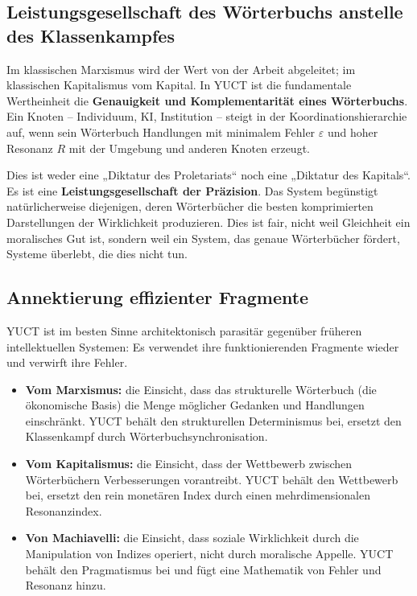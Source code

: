 \documentclass[12pt,a4paper]{article}
\begin{document}
\subsection{Leistungsgesellschaft des Wörterbuchs anstelle des Klassenkampfes}

Im klassischen Marxismus wird der Wert von der Arbeit abgeleitet; im klassischen Kapitalismus vom Kapital. In YUCT ist die fundamentale Wertheinheit die \textbf{Genauigkeit und Komplementarität eines Wörterbuchs}. Ein Knoten – Individuum, KI, Institution – steigt in der Koordinationshierarchie auf, wenn sein Wörterbuch Handlungen mit minimalem Fehler \(\varepsilon\) und hoher Resonanz \(R\) mit der Umgebung und anderen Knoten erzeugt.

Dies ist weder eine „Diktatur des Proletariats“ noch eine „Diktatur des Kapitals“. Es ist eine \textbf{Leistungsgesellschaft der Präzision}. Das System begünstigt natürlicherweise diejenigen, deren Wörterbücher die besten komprimierten Darstellungen der Wirklichkeit produzieren. Dies ist fair, nicht weil Gleichheit ein moralisches Gut ist, sondern weil ein System, das genaue Wörterbücher fördert, Systeme überlebt, die dies nicht tun.

\subsection{Annektierung effizienter Fragmente}

YUCT ist im besten Sinne architektonisch parasitär gegenüber früheren intellektuellen Systemen: Es verwendet ihre funktionierenden Fragmente wieder und verwirft ihre Fehler.

\begin{itemize}[leftmargin=*]
	\item \textbf{Vom Marxismus:} die Einsicht, dass das strukturelle Wörterbuch (die ökonomische Basis) die Menge möglicher Gedanken und Handlungen einschränkt. YUCT behält den strukturellen Determinismus bei, ersetzt den Klassenkampf durch Wörterbuchsynchronisation.
	\item \textbf{Vom Kapitalismus:} die Einsicht, dass der Wettbewerb zwischen Wörterbüchern Verbesserungen vorantreibt. YUCT behält den Wettbewerb bei, ersetzt den rein monetären Index durch einen mehrdimensionalen Resonanzindex.
	\item \textbf{Von Machiavelli:} die Einsicht, dass soziale Wirklichkeit durch die Manipulation von Indizes operiert, nicht durch moralische Appelle. YUCT behält den Pragmatismus bei und fügt eine Mathematik von Fehler und Resonanz hinzu.
\end{itemize}
\end{document}
